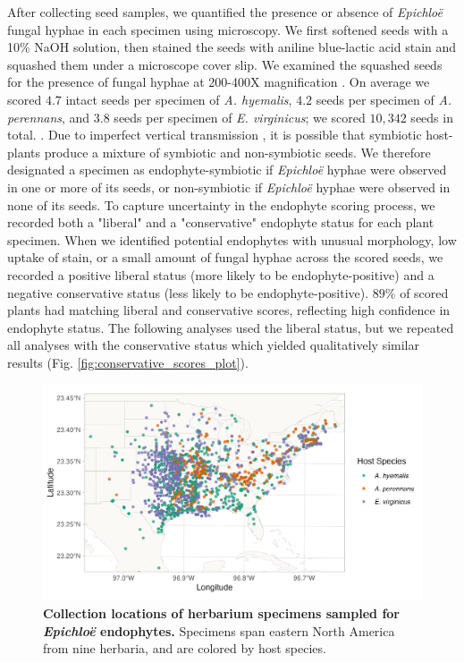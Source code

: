 \documentclass[11pt]{article}
\let\cite\citep
\begin{document}
After collecting seed samples, we quantified the presence or absence of \emph{Epichloë} fungal hyphae in each specimen using microscopy. 
We first softened seeds with a 10\% NaOH solution, then stained the seeds with aniline blue-lactic acid stain and squashed them under a microscope cover slip. 
We examined the squashed seeds for the presence of fungal hyphae at 200-400X magnification \cite{bacon2018stains}.
On average we scored $4.7$ intact seeds per specimen of \emph{A. hyemalis}, $4.2$ seeds per specimen of \emph{A. perennans}, and $3.8$ seeds per specimen of \emph{E. virginicus}; we scored $10,342$ seeds in total. .
Due to imperfect vertical transmission \cite{afkhami2008symbiosis}, it is possible that symbiotic host-plants produce a mixture of symbiotic and non-symbiotic seeds. 
We therefore designated a specimen as endophyte-symbiotic if \emph{Epichloë} hyphae were observed in one or more of its seeds, or non-symbiotic if \emph{Epichloë} hyphae were observed in none of its seeds. 
To capture uncertainty in the endophyte scoring process, we recorded both a "liberal" and a "conservative" endophyte status for each plant specimen.  
When we identified potential endophytes with unusual morphology, low uptake of stain, or a small amount of fungal hyphae across the scored seeds, we recorded a positive liberal status (more likely to be endophyte-positive) and a negative conservative status (less likely to be endophyte-positive). 
$89$\% of scored plants had matching liberal and conservative scores, reflecting high confidence in endophyte status.
The following analyses used the liberal status, but we repeated all analyses with the conservative status which yielded qualitatively similar results (Fig. \ref{fig:conservative_scores_plot}).

\begin{figure}[h]
	\centering
	\includegraphics[width = \linewidth]{../Plots/collections_map.png}
	\caption[Collection locations of herbarium specimens sampled for \emph{Epichloë} endophytes]{\textbf{Collection locations of herbarium specimens sampled for \emph{Epichloë} endophytes.} Specimens span eastern North America from nine herbaria, and are colored by host species.}
	\label{fig:map}
\end{figure}
\end{document}

